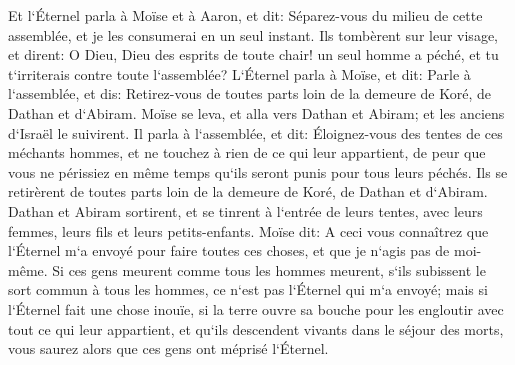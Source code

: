 \verse Et l`Éternel parla à Moïse et à Aaron, et dit: 
\verse Séparez-vous du milieu de cette assemblée, et je les consumerai en un seul instant. 
\verse Ils tombèrent sur leur visage, et dirent: O Dieu, Dieu des esprits de toute chair! un seul homme a péché, et tu t`irriterais contre toute l`assemblée? 
\verse L`Éternel parla à Moïse, et dit: 
\verse Parle à l`assemblée, et dis: Retirez-vous de toutes parts loin de la demeure de Koré, de Dathan et d`Abiram. 
\verse Moïse se leva, et alla vers Dathan et Abiram; et les anciens d`Israël le suivirent. 
\verse Il parla à l`assemblée, et dit: Éloignez-vous des tentes de ces méchants hommes, et ne touchez à rien de ce qui leur appartient, de peur que vous ne périssiez en même temps qu`ils seront punis pour tous leurs péchés. 
\verse Ils se retirèrent de toutes parts loin de la demeure de Koré, de Dathan et d`Abiram. Dathan et Abiram sortirent, et se tinrent à l`entrée de leurs tentes, avec leurs femmes, leurs fils et leurs petits-enfants. 
\verse Moïse dit: A ceci vous connaîtrez que l`Éternel m`a envoyé pour faire toutes ces choses, et que je n`agis pas de moi-même. 
\verse Si ces gens meurent comme tous les hommes meurent, s`ils subissent le sort commun à tous les hommes, ce n`est pas l`Éternel qui m`a envoyé; 
\verse mais si l`Éternel fait une chose inouïe, si la terre ouvre sa bouche pour les engloutir avec tout ce qui leur appartient, et qu`ils descendent vivants dans le séjour des morts, vous saurez alors que ces gens ont méprisé l`Éternel. 
